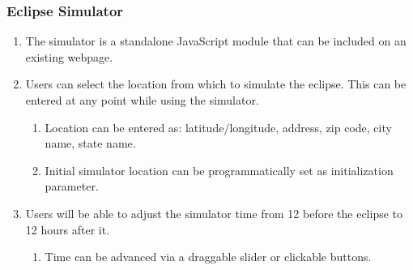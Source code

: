\documentclass[10pt, onecolumn, draftclsnofoot, letterpaper, compsoc]{IEEEtran}
\begin{document}
\subsubsection{Eclipse Simulator}
	\begin{enumerate}
		\item The simulator is a standalone JavaScript module that can
		be included on an existing webpage.

		\item Users can select the location from which to simulate the eclipse.
		This can be entered at any point while using the simulator.
		\begin{enumerate}
			\item Location can be entered as: latitude/longitude, address, zip code,
			city name, state name.
			\item Initial simulator location can be programmatically set as
			initialization parameter.
		\end{enumerate}

		\item Users will be able to adjust the simulator time from 12 before
		the eclipse to 12 hours after it.
		\begin{enumerate}
			\item Time can be advanced via a draggable slider or clickable buttons.
		\end{enumerate}

	\end{enumerate}
\end{document}
